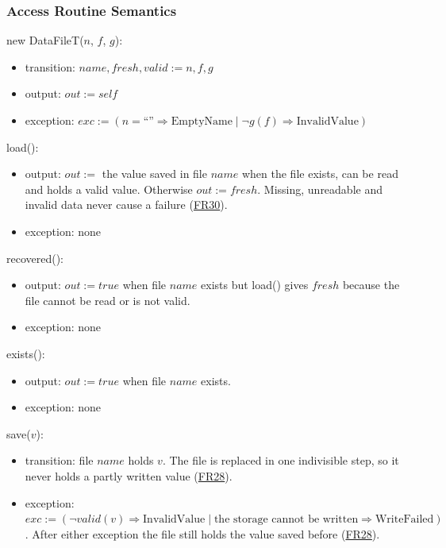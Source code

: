 \documentclass[10pt, titlepage]{article}
\newcommand{\srsurl}{https://team-hindsight.github.io/ophthamology-game/SRS/SRS.pdf}
\newcommand{\srsitemref}[2]{\href{\srsurl\#nameddest=#1}{#2}}
\newcommand{\T}[1]{\mathit{#1}}          %
\newcommand{\out}{\mathit{out}}
\newcommand{\exc}{\mathit{exc}}
\newcommand{\true}{\mathit{true}}
\begin{document}
\subsubsection{Access Routine Semantics}

\noindent new DataFileT($n$, $f$, $g$):
\begin{itemize}
\item transition: $\T{name}, \T{fresh}, \T{valid} := n, f, g$
\item output: $\out := \T{self}$
\item exception: $\exc := (n = \text{``''} \Rightarrow \text{EmptyName} \mid
  \neg g(f) \Rightarrow \text{InvalidValue})$
\end{itemize}

\noindent load():
\begin{itemize}
\item output: $\out :=$ the value saved in file $\T{name}$ when the file
  exists, can be read and holds a valid value. Otherwise $\out := \T{fresh}$.
  Missing, unreadable and invalid data never cause a failure
  (\srsitemref{FR_CorruptData}{FR30}).
\item exception: none
\end{itemize}

\noindent recovered():
\begin{itemize}
\item output: $\out := \true$ when file $\T{name}$ exists but load() gives
  $\T{fresh}$ because the file cannot be read or is not valid.
\item exception: none
\end{itemize}

\noindent exists():
\begin{itemize}
\item output: $\out := \true$ when file $\T{name}$ exists.
\item exception: none
\end{itemize}

\noindent save($v$):
\begin{itemize}
\item transition: file $\T{name}$ holds $v$. The file is replaced in one
  indivisible step, so it never holds a partly written value
  (\srsitemref{FR_PersistState}{FR28}).
\item exception: $\exc := (\neg\T{valid}(v) \Rightarrow \text{InvalidValue}
  \mid \text{the storage cannot be written} \Rightarrow \text{WriteFailed})$.
  After either exception the file still holds the value saved before
  (\srsitemref{FR_PersistState}{FR28}).
\end{itemize}
\end{document}
